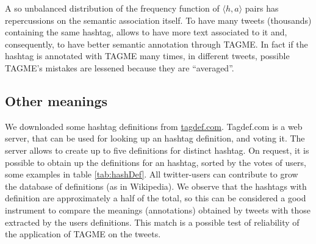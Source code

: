 \documentclass[a4paper,11pt,oneside]{article}
\newcommand{\ha}{$\langle h,a \rangle$\xspace}
\begin{document}

A so unbalanced distribution of the frequency function of \ha pairs has repercussions on the semantic association itself. To have many tweets (thousands) containing the same hashtag, allows to have more text associated to it and, consequently, to have better semantic annotation through TAGME.
In fact if the hashtag is annotated with TAGME many times, in different tweets, possible TAGME's mistakes are lessened because they are ``averaged''.



\subsection{Other meanings}
We downloaded some hashtag definitions from \href{http://tagdef.com/}{tagdef.com}. Tagdef.com is a web server, that can be used for looking up an hashtag definition, and voting it.
The server allows to create up to five definitions for distinct hashtag. On request, it is possible to obtain up the definitions for an hashtag, sorted by the votes of users, some examples in table \ref{tab:hashDef}. All twitter-users can contribute to grow the database of definitions (as in Wikipedia).
We observe that the hashtags with definition are approximately a half of the total, so this can be considered a good instrument to compare the meanings (annotations) obtained by tweets with those extracted by the users definitions.
This match is a possible test of reliability of the application of TAGME on the tweets. %
\end{document}
